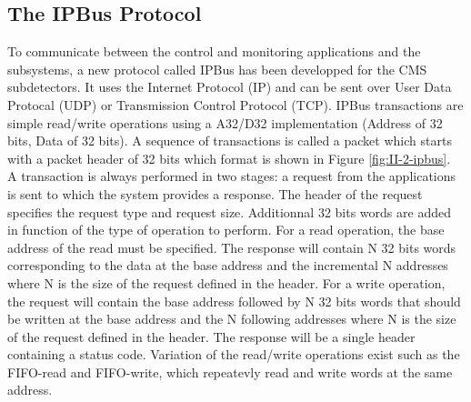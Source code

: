     \subsection{The IPBus Protocol}

      To communicate between the control and monitoring applications and the subsystems, a new protocol called IPBus has been developped for the CMS subdetectors. It uses the Internet Protocol (IP) and can be sent over User Data Protocal (UDP) or Transmission Control Protocol (TCP). IPBus transactions are simple read/write operations using a A32/D32 implementation (Address of 32 bits, Data of 32 bits). A sequence of transactions is called a packet which starts with a packet header of 32 bits which format is shown in Figure \ref{fig:II-2-ipbus}. \\

      A transaction is always performed in two stages: a request from the applications is sent to which the system provides a response. The header of the request specifies the request type and request size. Additionnal 32 bits words are added in function of the type of operation to perform. For a read operation, the base address of the read must be specified. The response will contain N 32 bits words corresponding to the data at the base address and the incremental N addresses where N is the size of the request defined in the header. For a write operation, the request will contain the base address followed by N 32 bits words that should be written at the base address and the N following addresses where N is the size of the request defined in the header. The response will be a single header containing a status code. Variation of the read/write operations exist such as the FIFO-read and FIFO-write, which repeatevly read and write words at the same address. \\


